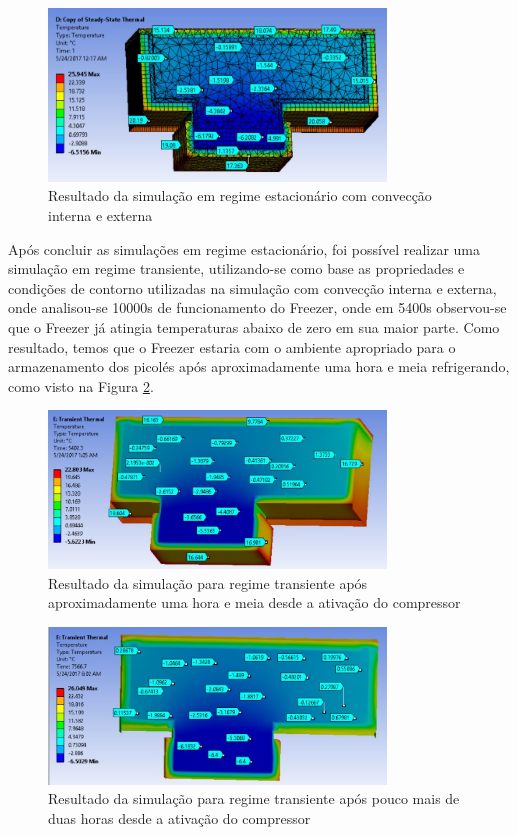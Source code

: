 \begin{itemize}
   \begin{figure}[H]
	\centering
    \includegraphics[width=0.8\textwidth]{figuras/simulacao_cooler}
    \caption{Resultado da simulação em regime estacionário com convecção interna e externa}
    \label{fig:simulacao_cooler}
\end{figure}

Após concluir as simulações em regime estacionário, foi possível realizar uma simulação em regime transiente, utilizando-se como base as propriedades e condições de contorno utilizadas na simulação com convecção interna e externa, onde analisou-se 10000s de funcionamento do Freezer, onde em 5400s observou-se que o Freezer já atingia temperaturas abaixo de zero em sua maior parte. Como resultado, temos que o Freezer estaria com o ambiente apropriado para o armazenamento dos picolés após aproximadamente uma hora e meia refrigerando, como visto na Figura \ref{fig:temp_5402}.

\begin{figure}[H]
\centering
 \includegraphics[width=0.8\textwidth]{figuras/temp_5402}
\caption{Resultado da simulação para regime transiente após aproximadamente uma hora e meia desde a ativação do compressor}
 \label{fig:temp_5402}
\end{figure}

\begin{figure}[H]
\centering
 \includegraphics[width=0.8\textwidth]{figuras/temp_7566}
\caption{Resultado da simulação para regime transiente após pouco mais de duas horas desde a ativação do compressor}
\label{fig:temp_7566}
\end{figure}


\end{itemize}
